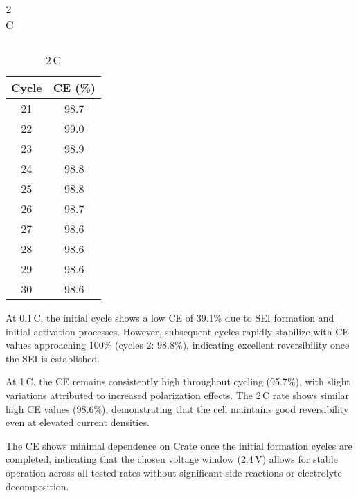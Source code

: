 \begin{table}[h]
\begin{subtable}[h]{0.32\textwidth}
\begin{tabular}{cc}
\bottomrule
\end{tabular}
\end{subtable}
\hfill
\begin{subtable}[h]{0.32\textwidth}
\centering
\caption{2\,C}
\begin{tabular}{cc}
\toprule
Cycle & CE (\%) \\
\midrule
21 & 98.7 \\
22 & 99.0 \\
23 & 98.9 \\
24 & 98.8 \\
25 & 98.8 \\
26 & 98.7 \\
27 & 98.6 \\
28 & 98.6 \\
29 & 98.6 \\
30 & 98.6 \\
\bottomrule
\end{tabular}
\end{subtable}
\end{table}

At 0.1\,C, the initial cycle shows a low CE of 39.1\% due to SEI formation and initial activation processes. However, subsequent cycles rapidly stabilize with CE values approaching 100\% (cycles 2: 98.8\%), indicating excellent reversibility once the SEI is established.

At 1\,C, the CE remains consistently high throughout cycling (95.7\%), with slight variations attributed to increased polarization effects. The 2\,C rate shows similar high CE values (98.6\%), demonstrating that the cell maintains good reversibility even at elevated current densities.

The CE shows minimal dependence on C\textendash rate once the initial formation cycles are completed, indicating that the chosen voltage window (2.4\,V) allows for stable operation across all tested rates without significant side reactions or electrolyte decomposition.
